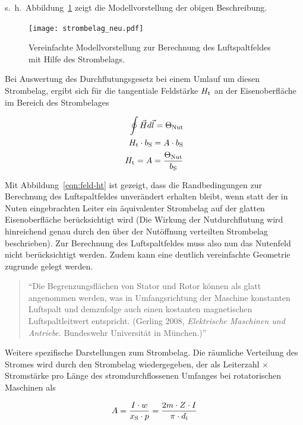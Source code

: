s.~h.~Abbildung~\ref{fig:strombelag-neu} zeigt die Modellvorstellung der obigen Beschreibung.

\begin{figure}[!h]
\centering
\texttt{[image: strombelag\_neu.pdf]}
\label{fig:strombelag-neu}
\caption{Vereinfachte Modellvorstellung zur Berechnung des Luftspaltfeldes mit Hilfe des Strombelags.}
\end{figure}

Bei Auswertung des Durchflutungsgesetz bei einem Umlauf um diesen Strombelag, ergibt sich für die tangentiale Feldstärke $H_{\mathrm{t}}$ an der Eisenoberfläche im Bereich des Strombelages

\begin{align}
\oint \vec{H}d\vec{l} = \Theta_{\mathrm{Nut}} \\
H_{\mathrm{t}}\cdot b_{\mathrm{S}} = A\cdot b_{\mathrm{S}} \\
H_{\mathrm{t}} = A = \frac{\Theta_{\mathrm{Nut}}}{b_{\mathrm{S}}} \label{eqn:feld-ht}
\end{align}

Mit Abbildung~\ref{eqn:feld-ht} ist gezeigt, dass die Randbedingungen zur Berechnung des Luftspaltfeldes unverändert erhalten bleibt, wenn statt der in Nuten eingebrachten Leiter ein äquivalenter Strombelag auf der glatten Eisenoberfläche berücksichtigt wird (Die Wirkung der Nutdurchflutung wird hinreichend genau durch den über der Nutöffnung verteilten Strombelag beschrieben).
Zur Berechnung des Luftspaltfeldes muss also nun das Nutenfeld nicht berücksichtigt werden.
Zudem kann eine deutlich vereinfachte Geometrie zugrunde gelegt werden.

\begin{quote}
\enquote{Die Begrenzungsflächen von Stator und Rotor können als glatt angenommen werden, was in Umfangsrichtung der Maschine konstanten Luftspalt und demzufolge auch einen kostanten magnetischen Luftspaltleitwert entspricht. (Gerling 2008, \emph{Elektrische Maschinen und Antriebe}. Bundeswehr Universität in München.)}
\end{quote}

Weitere spezifische Darstellungen zum Strombelag.
Die räumliche Verteilung des Stromes wird durch den Strombelag wiedergegeben, der als Leiterzahl $\times$ Stromstärke pro Länge des stromdurchflossenen Umfanges bei rotatorischen Maschinen als \autocite[S.~199]{hofmann2013}

\begin{align}
A = \frac{I \cdot w}{x_{\mathrm{S}}\cdot p} = \frac{2m \cdot Z\cdot I}{\pi \cdot d_{\mathrm{i}}} \label{eqn:strombelag2}
\end{align}

